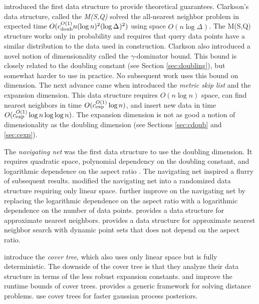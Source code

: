 \documentclass[../main.tex]{subfiles}
\newcommand{\aspect}[1]{\Delta_{#1}}
\newcommand{\cexp}{c_\textnormal{exp}}
\newcommand{\cdoub}{c_\textnormal{doub}}
\begin{document}
\cite{clarkson1997nearest} introduced the first data structure to provide theoretical guarantees.
Clarkson's data structure, called the \emph{M(S,Q)} solved the all-nearest neighbor problem in expected time $O(\cdoub^{O(1)}n(\log n)^2(\log \aspect{})^2)$ using space $O(n\log\aspect{})$.
The M(S,Q) structure works only in probability
and requires that query data points have a similar distribution to the data used in construction.
Clarkson also introduced a novel notion of dimensionality called the $\gamma$-dominator bound.
This bound is closely related to the doubling constant (see Section \ref{sec:doubling}),
but somewhat harder to use in practice.
No subsequent work uses this bound on dimension.
The next advance came when \citep{karger2002finding} introduced the \emph{metric skip list} and the expansion dimension. 
This data structure requires $O(n\log n)$ space, 
can find nearest neighbors in time $O(\cexp^{O(1)}\log n)$,
and insert new data in time $O(\cexp^{O(1)}\log n \log \log n)$.
The expansion dimension is not as good a notion of dimensionality as the doubling dimension
(see Sections \ref{sec:cdoub} and \ref{sec:cexp}).

The \emph{navigating net} was the first data structure to use the doubling dimension.
It requires quadratic space, 
polynomial dependency on the doubling constant, 
and logarithmic dependence on the aspect ratio \citep{krauthgamer2004navigating}.
The navigating net inspired a flurry of subsequent results.
\citet{hildrum2004note} modified the navigating net into a randomized data structure requiring only linear space.
\cite{krauthgamer2005black} further improve on the navigating net by replacing the logarithmic dependence on the aspect ratio with a logarithmic dependence on the number of data points.
\cite{har2006fast} provides a data structure for approximate nearest neighbors.
\cite{cole2006searching} provides a data structure for approximate nearest neighbor search with dynamic point sets that does not depend on the aspect ratio.

\citet{beygelzimer2006cover} introduce the \emph{cover tree},
which also uses only linear space but is fully deterministic.
The downside of the cover tree is that they analyze their data structure in terms of the less robust expansion constants.
\cite{ram2009linear} and \cite{curtin2015plug} improve the runtime bounds of cover trees.
\cite{curtin2013tree} provides a generic framework for solving distance problems.
\cite{moore2014fast} use cover trees for faster gaussian process posteriors.
\end{document}

